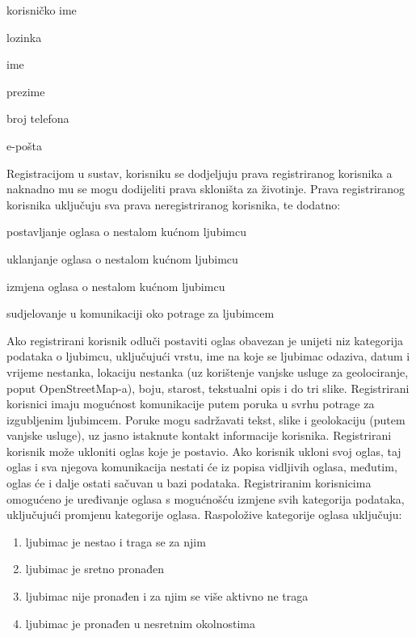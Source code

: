 		\begin{packed_item}
			\item korisničko ime
			\item lozinka
			\item ime
			\item prezime
			\item broj telefona
			\item e-pošta
		\end{packed_item}
		
		Registracijom u sustav, korisniku se dodjeljuju prava registriranog korisnika a naknadno mu se mogu dodijeliti prava skloništa za životinje. Prava registriranog korisnika uključuju sva prava neregistriranog korisnika, te dodatno:
		
		\begin{packed_item}
			\item postavljanje oglasa o nestalom kućnom ljubimcu
			\item uklanjanje oglasa o nestalom kućnom ljubimcu
			\item izmjena oglasa o nestalom kućnom ljubimcu
			\item sudjelovanje u komunikaciji oko potrage za ljubimcem
		\end{packed_item}
		
		Ako registrirani korisnik odluči postaviti oglas obavezan je unijeti niz kategorija podataka o ljubimcu, uključujući vrstu, ime na koje se ljubimac odaziva, datum i vrijeme nestanka, lokaciju nestanka (uz korištenje vanjske usluge za geolociranje, poput OpenStreetMap-a), boju, starost, tekstualni opis i do tri slike. Registrirani korisnici imaju mogućnost komunikacije putem poruka u svrhu potrage za izgubljenim ljubimcem. Poruke mogu sadržavati tekst, slike i geolokaciju (putem vanjske usluge), uz jasno istaknute kontakt informacije korisnika. Registrirani korisnik može ukloniti oglas koje je postavio. Ako korisnik ukloni svoj oglas, taj oglas i sva njegova komunikacija nestati će iz popisa vidljivih oglasa, međutim, oglas će i dalje ostati sačuvan u bazi podataka. Registriranim korisnicima omogućeno je uređivanje oglasa s mogućnošću izmjene svih kategorija podataka, uključujući promjenu kategorije oglasa. Raspoložive kategorije oglasa uključuju:
		
		\begin{enumerate}
			\item ljubimac je nestao i traga se za njim
			\item ljubimac je sretno pronađen
			\item ljubimac nije pronađen i za njim se više aktivno ne traga
			\item ljubimac je pronađen u nesretnim okolnostima
		\end{enumerate}
		
